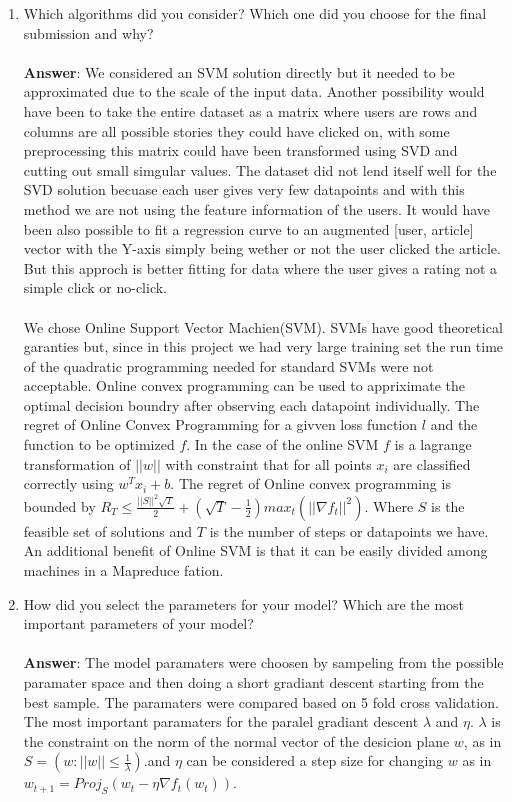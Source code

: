 \documentclass[11pt]{article}
\begin{document}
\begin{enumerate}
\item Which algorithms did you consider? Which one did you choose for the
  final submission and why? \\ \\
\textbf{Answer}:  
We considered an SVM solution directly but it needed to be approximated due to the scale of the input data. Another possibility would have been to take the entire dataset as a matrix where users are rows and columns are all possible stories they could have clicked on, with some preprocessing this matrix could have been transformed using SVD and cutting out small simgular values. The dataset did not lend itself well for the SVD solution becuase each user gives very few datapoints and with this method we are not using the feature information of the users. It would have been also possible to fit a regression curve to an augmented [user, article] vector with the Y-axis simply being wether or not the user clicked the article. But this approch is better fitting for data where the user gives a rating not a simple click or no-click. 
\\ \\
We chose Online Support Vector Machien(SVM). SVMs have good theoretical garanties but, since in this project we had very large training set the run time of the quadratic programming needed for standard SVMs were not acceptable. Online convex programming can be used to appriximate the optimal decision boundry after observing each datapoint individually. The regret of Online Convex Programming for a givven loss function $l$ and the function to be optimized $f$. In the case of the online SVM $f$ is a lagrange transformation of $||w||$ with constraint that for all points $x_i$ are classified correctly using $w^T x_i + b$. The regret of Online convex programming is bounded by $R_T \leq \frac{||S||^2 \sqrt{T}}{2} + (\sqrt{T} - \frac{1}{2}) max_t(||\nabla f_t||^2)$. Where $S$ is the feasible set of solutions and $T$ is the number of steps or datapoints we have. An additional benefit of Online SVM is that it can be easily divided among machines in a Mapreduce fation.  

\item How did you select the parameters for your model? Which are the
  most important parameters of your model? \\ \\
\textbf{Answer}: The model paramaters were choosen by sampeling from the possible paramater space and then doing a short gradiant descent starting from the best sample. The paramaters were compared based on 5 fold cross validation. The most important paramaters for the paralel gradiant descent $\lambda$ and $\eta$. $\lambda$ is the constraint on the norm of the normal vector of the desicion plane $w$, as in $S=(w:||w||\leq \frac{1}{\lambda})$.and $\eta$ can be considered a step size for changing $w$ as in $w_{t+1} = Proj_S(w_t - \eta \nabla f_t(w_t))$.

\end{enumerate}
\end{document}
